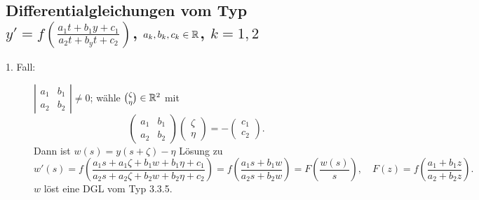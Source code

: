\subsection{Differentialgleichungen vom Typ $ y'=f\left(\frac{a_1t+b_1y+c_1}{a_2t+b_yt+c_2}\right) $, $ a_k,b_k,c_k\in\mathbb{R} $, $ k=1,2 $}
\begin{description}
	\item[1. Fall:] $ \left|\begin{smallmatrix}
	a_1&b_1\\a_2&b_2
	\end{smallmatrix}\right|\neq 0 $; w\"ahle $ \binom{\zeta}{\eta}\in\mathbb{R}^2 $ mit 
	\[ \begin{pmatrix}
	a_1&b_1\\a_2&b_2
	\end{pmatrix} \begin{pmatrix}
	\zeta\\\eta
	\end{pmatrix}=-\begin{pmatrix}
	c_1\\c_2
	\end{pmatrix}. \]
	Dann ist $ w(s)=y(s+\zeta)-\eta $ L\"osung zu 
	\[ w'(s)=f\left(\frac{a_1s+a_1\zeta+b_1w+b_1\eta+c_1}{a_2s+a_2\zeta+b_2w+b_2\eta+c_2}\right)=f\left(\frac{a_1s+b_1w}{a_2s+b_2w}\right)=F\left(\frac{w(s)}{s}\right),\quad F(z)=f\left(\frac{a_1+b_1z}{a_2+b_2z}\right). \]
	$ w $ l\"ost eine DGL vom Typ 3.3.5.
\end{description}
